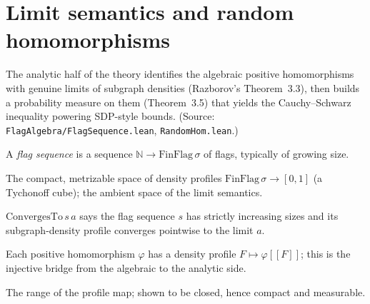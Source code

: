 \chapter{Limit semantics and random homomorphisms}
\label{chap:limits}

The analytic half of the theory identifies the algebraic positive homomorphisms
with genuine limits of subgraph densities (Razborov's Theorem~3.3), then builds a
probability measure on them (Theorem~3.5) that yields the Cauchy--Schwarz
inequality powering SDP-style bounds. (Source:
\texttt{FlagAlgebra/FlagSequence.lean}, \texttt{RandomHom.lean}.)

\begin{definition}
  \label{def:flag-seq}
  \leanok
  A \emph{flag sequence} is a sequence $\mathbb{N} \to \mathrm{FinFlag}\,\sigma$
  of flags, typically of growing size.
\end{definition}

\begin{definition}
  \label{def:flag-density-space}
  \leanok
  The compact, metrizable space of density profiles $\mathrm{FinFlag}\,\sigma \to
  [0,1]$ (a Tychonoff cube); the ambient space of the limit semantics.
\end{definition}

\begin{definition}[Convergence]
  \label{def:converges-to}
  \leanok
  $\mathrm{ConvergesTo}\,s\,a$ says the flag sequence $s$ has strictly increasing
  sizes and its subgraph-density profile converges pointwise to the limit $a$.
\end{definition}

\begin{definition}
  \label{def:positive-hom-coe}
  \leanok
  Each positive homomorphism $\varphi$ has a density profile
  $F \mapsto \varphi[\![F]\!]$; this is the injective bridge from the algebraic
  to the analytic side.
\end{definition}

\begin{definition}
  \label{def:positive-hom-space}
  \leanok
  The range of the profile map; shown to be closed, hence compact and
  measurable.
\end{definition}

